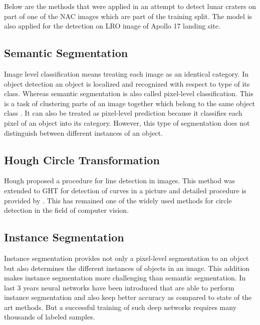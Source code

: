 \documentclass[11pt]{article}
\begin{document}
Below are the methods that were applied in an attempt to detect lunar craters on part of one of the NAC images which are part of the training split. The model is also applied for the detection on LRO image of Apollo 17 landing site.

\subsection{Semantic Segmentation}
Image level classification means treating each image as an identical category. In object detection an object is localized and recognized with respect to type of its class. Whereas semantic segmentation is also called pixel-level classification. This is a task of clustering parts of an image together which belong to the same object class \cite{thoma2016survey}. It can also be treated as pixel-level prediction because it classifies each pixel of an object into its category. However, this type of segmentation does not distinguish between different instances of an object.

\subsection{Hough Circle Transformation}
Hough proposed a procedure for line detection in images. This method was extended to GHT for detection of curves in a picture and detailed procedure is provided by \cite{duda1972use}. This has remained one of the widely used methods for circle detection in the field of computer vision.

\subsection{Instance Segmentation}
Instance segmentation provides not only a pixel-level segmentation to an object but also determines the different instances of objects in an image. This addition makes instance segmentation more challenging than semantic segmentation. In last 3 years neural networks have been introduced that are able to perform instance segmentation and also keep better accuracy as compared to state of the art methods. But a successful training of such deep networks requires many thousands of labeled samples. 
\end{document}
